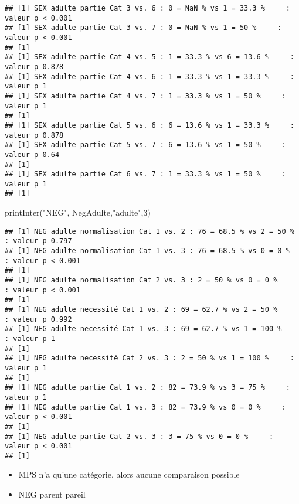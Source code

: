 \documentclass[
]{article}
\newenvironment{Shaded}{\begin{snugshade}}{\end{snugshade}}
\newcommand{\DecValTok}[1]{\textcolor[rgb]{0.00,0.00,0.81}{#1}}
\newcommand{\FunctionTok}[1]{\textcolor[rgb]{0.00,0.00,0.00}{#1}}
\newcommand{\NormalTok}[1]{#1}
\newcommand{\StringTok}[1]{\textcolor[rgb]{0.31,0.60,0.02}{#1}}
\providecommand{\tightlist}{%
  \setlength{\itemsep}{0pt}\setlength{\parskip}{0pt}}
\begin{document}
\begin{verbatim}
## [1] SEX adulte partie Cat 3 vs. 6 : 0 = NaN % vs 1 = 33.3 %     : valeur p < 0.001
## [1] SEX adulte partie Cat 3 vs. 7 : 0 = NaN % vs 1 = 50 %     : valeur p < 0.001
## [1] 
## [1] SEX adulte partie Cat 4 vs. 5 : 1 = 33.3 % vs 6 = 13.6 %     : valeur p 0.878
## [1] SEX adulte partie Cat 4 vs. 6 : 1 = 33.3 % vs 1 = 33.3 %     : valeur p 1
## [1] SEX adulte partie Cat 4 vs. 7 : 1 = 33.3 % vs 1 = 50 %     : valeur p 1
## [1] 
## [1] SEX adulte partie Cat 5 vs. 6 : 6 = 13.6 % vs 1 = 33.3 %     : valeur p 0.878
## [1] SEX adulte partie Cat 5 vs. 7 : 6 = 13.6 % vs 1 = 50 %     : valeur p 0.64
## [1] 
## [1] SEX adulte partie Cat 6 vs. 7 : 1 = 33.3 % vs 1 = 50 %     : valeur p 1
## [1]
\end{verbatim}

\begin{Shaded}
\begin{Highlighting}[]
\FunctionTok{printInter}\NormalTok{(}\StringTok{"NEG"}\NormalTok{, NegAdulte,}\StringTok{"adulte"}\NormalTok{,}\DecValTok{3}\NormalTok{)}
\end{Highlighting}
\end{Shaded}

\begin{verbatim}
## [1] NEG adulte normalisation Cat 1 vs. 2 : 76 = 68.5 % vs 2 = 50 %     : valeur p 0.797
## [1] NEG adulte normalisation Cat 1 vs. 3 : 76 = 68.5 % vs 0 = 0 %     : valeur p < 0.001
## [1] 
## [1] NEG adulte normalisation Cat 2 vs. 3 : 2 = 50 % vs 0 = 0 %     : valeur p < 0.001
## [1] 
## [1] NEG adulte necessité Cat 1 vs. 2 : 69 = 62.7 % vs 2 = 50 %     : valeur p 0.992
## [1] NEG adulte necessité Cat 1 vs. 3 : 69 = 62.7 % vs 1 = 100 %     : valeur p 1
## [1] 
## [1] NEG adulte necessité Cat 2 vs. 3 : 2 = 50 % vs 1 = 100 %     : valeur p 1
## [1] 
## [1] NEG adulte partie Cat 1 vs. 2 : 82 = 73.9 % vs 3 = 75 %     : valeur p 1
## [1] NEG adulte partie Cat 1 vs. 3 : 82 = 73.9 % vs 0 = 0 %     : valeur p < 0.001
## [1] 
## [1] NEG adulte partie Cat 2 vs. 3 : 3 = 75 % vs 0 = 0 %     : valeur p < 0.001
## [1]
\end{verbatim}

\begin{itemize}
\tightlist
\item
  MPS n'a qu'une catégorie, alors aucune comparaison possible
\item
  NEG parent pareil
\end{itemize}
\end{document}

